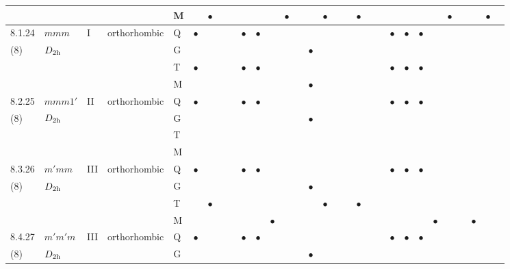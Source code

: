 \documentclass[fleqn,9pt,landscape]{jsarticle}
\begin{document}
\begin{longtable}{lllll|l|lll|ll|lll|l|lll|lll|l|ll|lll|lll}
 &  &  &  & M &  & $\bullet$ &  &  &  &  &  & $\bullet$ &  &  & $\bullet$ &  &  & $\bullet$ &  &  &  &  &  &  & $\bullet$ &  &  & $\bullet$ &  \\ \hline
8.1.24 & \texttt{$mmm$} & I & orthorhombic & Q & $\bullet$ &  &  &  & $\bullet$ & $\bullet$ &  &  &  &  &  &  &  &  &  &  & $\bullet$ & $\bullet$ & $\bullet$ &  &  &  &  &  &  \\
(8) & $D_{\rm 2h}$ &  &  & G &  &  &  &  &  &  &  &  &  & $\bullet$ &  &  &  &  &  &  &  &  &  &  &  &  &  &  &  \\
 &  &  &  & T & $\bullet$ &  &  &  & $\bullet$ & $\bullet$ &  &  &  &  &  &  &  &  &  &  & $\bullet$ & $\bullet$ & $\bullet$ &  &  &  &  &  &  \\
 &  &  &  & M &  &  &  &  &  &  &  &  &  & $\bullet$ &  &  &  &  &  &  &  &  &  &  &  &  &  &  &  \\ \hline
8.2.25 & \texttt{$mmm1'$} & II & orthorhombic & Q & $\bullet$ &  &  &  & $\bullet$ & $\bullet$ &  &  &  &  &  &  &  &  &  &  & $\bullet$ & $\bullet$ & $\bullet$ &  &  &  &  &  &  \\
(8) & $D_{\rm 2h}$ &  &  & G &  &  &  &  &  &  &  &  &  & $\bullet$ &  &  &  &  &  &  &  &  &  &  &  &  &  &  &  \\
 &  &  &  & T &  &  &  &  &  &  &  &  &  &  &  &  &  &  &  &  &  &  &  &  &  &  &  &  &  \\
 &  &  &  & M &  &  &  &  &  &  &  &  &  &  &  &  &  &  &  &  &  &  &  &  &  &  &  &  &  \\ \hline
8.3.26 & \texttt{$m'mm$} & III & orthorhombic & Q & $\bullet$ &  &  &  & $\bullet$ & $\bullet$ &  &  &  &  &  &  &  &  &  &  & $\bullet$ & $\bullet$ & $\bullet$ &  &  &  &  &  &  \\
(8) & $D_{\rm 2h}$ &  &  & G &  &  &  &  &  &  &  &  &  & $\bullet$ &  &  &  &  &  &  &  &  &  &  &  &  &  &  &  \\
 &  &  &  & T &  & $\bullet$ &  &  &  &  &  &  &  &  & $\bullet$ &  &  & $\bullet$ &  &  &  &  &  &  &  &  &  &  &  \\
 &  &  &  & M &  &  &  &  &  &  & $\bullet$ &  &  &  &  &  &  &  &  &  &  &  &  & $\bullet$ &  &  & $\bullet$ &  &  \\ \hline
8.4.27 & \texttt{$m'm'm$} & III & orthorhombic & Q & $\bullet$ &  &  &  & $\bullet$ & $\bullet$ &  &  &  &  &  &  &  &  &  &  & $\bullet$ & $\bullet$ & $\bullet$ &  &  &  &  &  &  \\
(8) & $D_{\rm 2h}$ &  &  & G &  &  &  &  &  &  &  &  &  & $\bullet$ &  &  &  &  &  &  &  &  &  &  &  &  &  &  &  \\

\end{longtable}
\end{document}
